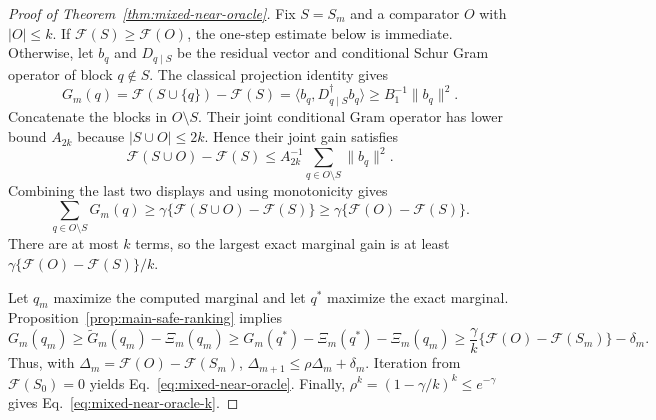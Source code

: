 \documentclass[10pt,a4paper]{amsart}
\begin{document}
\begin{proof}[Proof of Theorem~\ref{thm:mixed-near-oracle}]
Fix $S=S_m$ and a comparator $O$ with $|O|\leq k$.  If
$\mathcal F(S)\geq\mathcal F(O)$, the one-step estimate below is immediate.
Otherwise, let $b_q$ and $D_{q\mid S}$ be the residual vector and conditional
Schur Gram operator of block $q\notin S$.  The classical projection identity
gives
\[
 G_m(q)=\mathcal F(S\cup\{q\})-\mathcal F(S)
 =\langle b_q,D_{q\mid S}^{\dagger}b_q\rangle
 \geq B_1^{-1}\|b_q\|^2.
\]
Concatenate the blocks in $O\setminus S$.  Their joint conditional Gram
operator has lower bound $A_{2k}$ because
$|S\cup O|\leq2k$.  Hence their joint gain satisfies
\[
 \mathcal F(S\cup O)-\mathcal F(S)
 \leq A_{2k}^{-1}\sum_{q\in O\setminus S}\|b_q\|^2.
\]
Combining the last two displays and using monotonicity gives
\[
 \sum_{q\in O\setminus S}G_m(q)
 \geq\gamma\{\mathcal F(S\cup O)-\mathcal F(S)\}
 \geq\gamma\{\mathcal F(O)-\mathcal F(S)\}.
\]
There are at most $k$ terms, so the largest exact marginal gain is at least
$\gamma\{\mathcal F(O)-\mathcal F(S)\}/k$.

Let $q_m$ maximize the computed marginal and let $q^*$ maximize the exact
marginal.  Proposition~\ref{prop:main-safe-ranking} implies
\[
 G_m(q_m)\geq \widetilde G_m(q_m)-\Xi_m(q_m)
 \geq G_m(q^*)-\Xi_m(q^*)-\Xi_m(q_m)
 \geq \frac{\gamma}{k}
       \{\mathcal F(O)-\mathcal F(S_m)\}-\delta_m.
\]
Thus, with $\Delta_m=\mathcal F(O)-\mathcal F(S_m)$,
$\Delta_{m+1}\leq\rho\Delta_m+\delta_m$.  Iteration from
$\mathcal F(S_0)=0$ yields Eq.~\eqref{eq:mixed-near-oracle}.  Finally,
$\rho^k=(1-\gamma/k)^k\leq e^{-\gamma}$ gives
Eq.~\eqref{eq:mixed-near-oracle-k}.
\end{proof}
\end{document}
